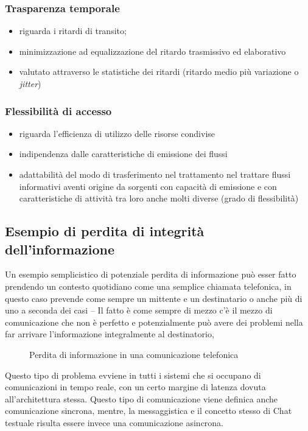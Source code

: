 \subsubsection{Trasparenza temporale}
\label{sec:trtemp}
\begin{itemize}
\item riguarda i ritardi di transito;
\item minimizzazione ad equalizzazione del ritardo trasmissivo ed elaborativo
\item valutato attraverso le statistiche dei ritardi (ritardo medio più variazione o \textit{jitter})
\end{itemize}

\subsubsection{Flessibilità di accesso}
\label{sec:fldiacc}

\begin{itemize}
\item riguarda l'efficienza di utilizzo delle risorse condivise
\item indipendenza dalle caratteristiche di emissione dei flussi
\item adattabilità del modo di trasferimento nel trattamento nel trattare flussi informativi
  aventi origine da sorgenti con capacità di emissione e con caratteristiche di attività tra loro anche molti
  diverse (grado di flessibilità)
\end{itemize}
\clearpage
\subsection{Esempio di perdita di integrità dell'informazione}
\label{sec:esPerInfo}
Un esempio semplicistico di potenziale perdita di informazione può esser fatto prendendo un contesto quotidiano
come una semplice chiamata telefonica, in questo caso prevende come sempre un mittente e un destinatario o anche
più di uno a seconda dei casi -- Il fatto è come sempre di mezzo c'è il mezzo di comunicazione che non è perfetto
e potenzialmente può avere dei problemi nella far arrivare l'informazione integralmente al destinatorio, 
\begin{figure}[ht!]
  \centering
  
  \caption{Perdita di informazione in una comunicazione telefonica}
  \label{fig:perddiinfoinretetel}
\end{figure}
\begin{oss}
  Questo tipo di problema evviene in tutti i sistemi che si occupano di comunicazioni in tempo reale, con un certo
  margine di latenza dovuta all'architettura stessa. Questo tipo di comunicazione viene definica anche
  comunicazione sincrona, mentre, la messaggistica e il concetto stesso di Chat testuale risulta essere invece
  una comunicazione asincrona.
\end{oss}

